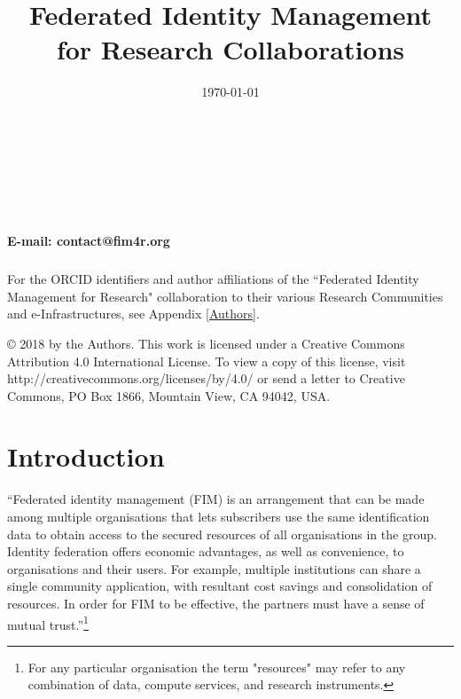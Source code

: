 \documentclass[fleqn,11pt]{wlscirep}
\title{Federated Identity Management for Research Collaborations}
\date{\today}
\begin{document}
\flushbottom


\maketitle

\thispagestyle{empty}



\noindent \\ \\ \\ \\ {\textbf{E-mail: contact@fim4r.org} \\  \\ For the ORCID{\textsuperscript{\textregistered}} identifiers and author affiliations of the ``Federated Identity Management for Research" collaboration to their various Research Communities and e-Infrastructures, see Appendix \ref{Authors}.
\newline
\newline
{}
\newline

\vfill

\noindent © 2018 by the Authors. This work is licensed under a Creative Commons Attribution 4.0 International License. To view a copy of this license, visit http://creativecommons.org/licenses/by/4.0/ or send a letter to Creative Commons, PO Box 1866, Mountain View, CA 94042, USA.

\newpage
\tableofcontents
\newpage
\section{Introduction}
“Federated identity management (FIM) is an arrangement that can be made among multiple organisations that lets subscribers use the same identification data to obtain access to the secured resources of all organisations in the group. Identity federation offers economic advantages, as well as convenience, to organisations and their users. For example, multiple institutions can share a single community application, with resultant cost savings and consolidation of resources. In order for FIM to be effective, the partners must have a sense of mutual trust.”\cite{FIM4Rv1:2012}\footnote{For any particular organisation the term "resources" may refer to any combination of data, compute services, and research instruments.} 

}
\end{document}
